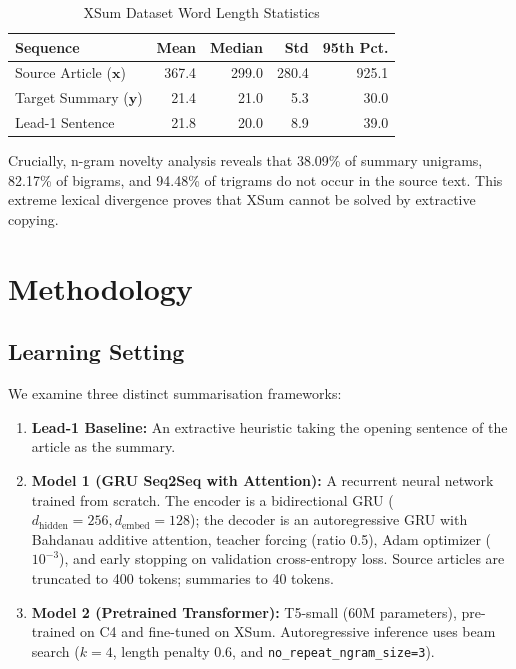 \documentclass[conference]{IEEEtran}
\begin{document}
\begin{table}[htbp]
\caption{XSum Dataset Word Length Statistics}
\label{tab:stats}
\centering
\small
\begin{tabular}{lrrrr}
\toprule
\textbf{Sequence} & \textbf{Mean} & \textbf{Median} & \textbf{Std} & \textbf{95th Pct.} \\
\midrule
Source Article ($\mathbf{x}$) & 367.4 & 299.0 & 280.4 & 925.1 \\
Target Summary ($\mathbf{y}$) & 21.4 & 21.0 & 5.3 & 30.0 \\
Lead-1 Sentence & 21.8 & 20.0 & 8.9 & 39.0 \\
\bottomrule
\end{tabular}
\end{table}

Crucially, n-gram novelty analysis reveals that 38.09\% of summary unigrams, 82.17\% of bigrams, and 94.48\% of trigrams do not occur in the source text. This extreme lexical divergence proves that XSum cannot be solved by extractive copying.

\section{Methodology}

\subsection{Learning Setting}
We examine three distinct summarisation frameworks:
\begin{enumerate}
    \item \textbf{Lead-1 Baseline:} An extractive heuristic taking the opening sentence of the article as the summary.
    \item \textbf{Model 1 (GRU Seq2Seq with Attention):} A recurrent neural network trained from scratch. The encoder is a bidirectional GRU ($d_{\text{hidden}}=256, d_{\text{embed}}=128$); the decoder is an autoregressive GRU with Bahdanau additive attention, teacher forcing (ratio 0.5), Adam optimizer ($10^{-3}$), and early stopping on validation cross-entropy loss. Source articles are truncated to 400 tokens; summaries to 40 tokens.
    \item \textbf{Model 2 (Pretrained Transformer):} T5-small (60M parameters), pre-trained on C4 and fine-tuned on XSum. Autoregressive inference uses beam search ($k=4$, length penalty 0.6, and \texttt{no\_repeat\_ngram\_size=3}).
\end{enumerate}
\end{document}
